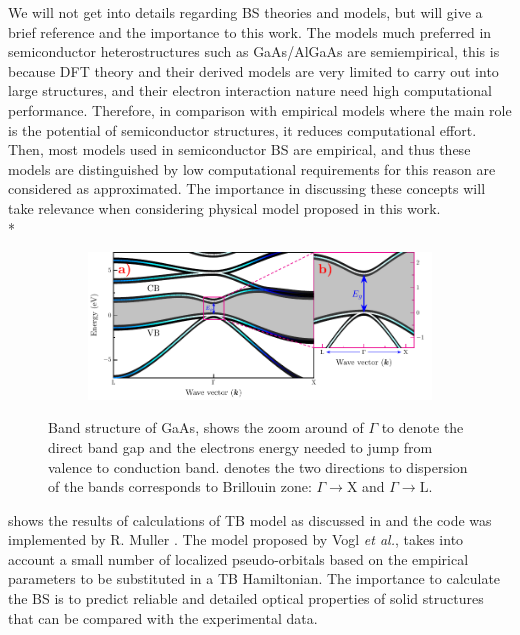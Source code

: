We will not get into details regarding BS theories and models, but will give a brief reference and the importance to this work. The models much preferred in semiconductor heterostructures such as GaAs/AlGaAs are semiempirical, this is because
\gls{DFT} theory and their derived models are very limited to carry out into large structures, and
their electron interaction nature need high computational performance. Therefore, in comparison
with empirical models where the main role is the potential of semiconductor structures, it reduces computational effort.
Then, most models used in semiconductor BS are empirical, and thus these models are distinguished by low computational requirements for this reason are considered as approximated. The importance in discussing these concepts will take relevance when considering physical model proposed in this work. \\*
\begin{figure}[h!]\label{fig:subsubsection-1.1.1-GaAsbands-1}
	\centering
	\begin{subfigure}{\textwidth}
	\includegraphics[width=\linewidth]{../figures/chapter-1/bands/build/bands01}
	\label{subfig:subsubsection-1.1.1-GaAsbands-1-a)}
	\label{subfig:subsubsection-1.1.1-GaAsbands-1-b)}
\end{subfigure}
	\caption{Band structure of GaAs,  shows the zoom around of $\Gamma$  to denote the direct band gap and the electrons energy  needed to jump from valence to conduction band.  denotes the two directions to dispersion of the bands corresponds to Brillouin zone: $\Gamma\to\mathrm{X}$ and  $\Gamma\to\mathrm{L}$.\cite{fox2002optical}}
\end{figure}
 shows the results of calculations of \gls{TB} model as discussed in \cite{vogl1983asemiempirical} and the code was implemented by R. Muller \cite{rpmuller2017}. The model proposed by Vogl \textit{et al.},  takes into account a small number of localized pseudo-orbitals  based on the empirical parameters to be  substituted in a TB Hamiltonian.  The importance to calculate the BS is to  predict  reliable and detailed optical properties of solid structures that can be compared with the experimental data.

